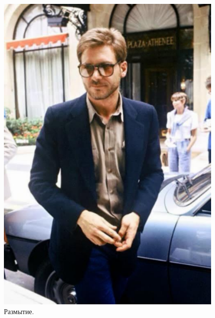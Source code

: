 \documentclass[a4paper,12pt]{article}
\begin{document}
\begin{figure}[h]
\begin{center}
\begin{minipage}[h]{0.3\linewidth}
\includegraphics[width=1\linewidth]{Pic_matrix_Gauss_blur}
Размытие. 
\end{minipage}
\end{center}

\vspace{5mm}


\end{figure}
\end{document}
